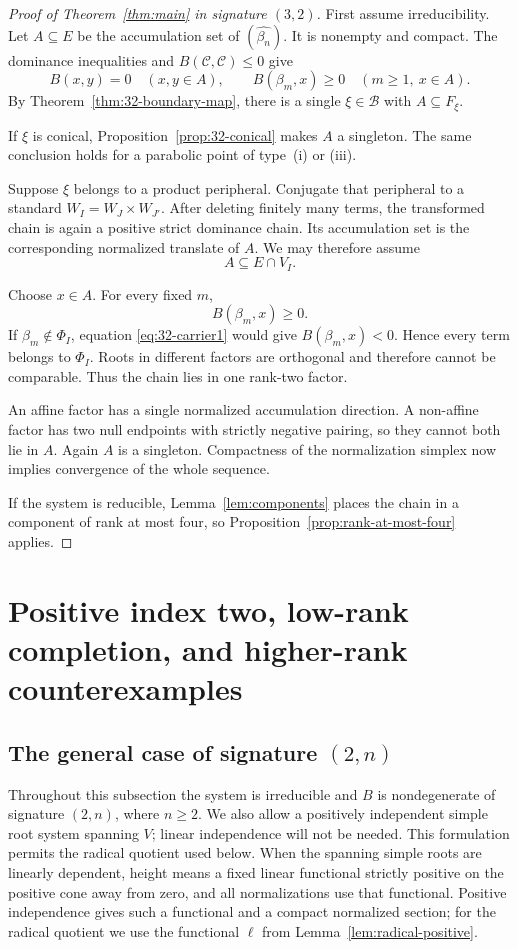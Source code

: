 \documentclass[11pt,reqno]{amsart}
\theoremstyle{plain}
\theoremstyle{definition}
\theoremstyle{remark}
\numberwithin{equation}{section}
\begin{document}
\begin{proof}[Proof of Theorem~\ref{thm:main} in signature $(3,2)$]
First assume irreducibility.
Let $A\subseteq E$ be the accumulation set of
$(\widehat{\beta_n})$.
It is nonempty and compact.
The dominance inequalities and
$B(\mathcal C,\mathcal C)\leq0$ give
\[
    B(x,y)=0\quad(x,y\in A),
    \qquad
    B(\beta_m,x)\geq0\quad(m\geq1,\ x\in A).
\]
By Theorem~\ref{thm:32-boundary-map},
there is a single $\xi\in\mathcal B$ with
$A\subseteq F_\xi$.

If $\xi$ is conical,
Proposition~\ref{prop:32-conical} makes $A$ a singleton.
The same conclusion holds for a parabolic point of
type~\textup{(i)} or \textup{(iii)}.

Suppose $\xi$ belongs to a product peripheral.
Conjugate that peripheral to a standard
$W_I=W_J\times W_{J'}$.
After deleting finitely many terms, the transformed
chain is again a positive strict dominance chain.
Its accumulation set is the corresponding normalized
translate of $A$.
We may therefore assume
\[
    A\subseteq E\cap V_I.
\]

Choose $x\in A$.
For every fixed $m$,
\[
    B(\beta_m,x)\geq0.
\]
If $\beta_m\notin\Phi_I$,
equation \eqref{eq:32-carrier1} would give
$B(\beta_m,x)<0$.
Hence every term belongs to $\Phi_I$.
Roots in different factors are orthogonal and therefore
cannot be comparable.
Thus the chain lies in one rank-two factor.

An affine factor has a single normalized accumulation
direction.
A non-affine factor has two null endpoints with strictly
negative pairing, so they cannot both lie in $A$.
Again $A$ is a singleton.
Compactness of the normalization simplex now implies
convergence of the whole sequence.

If the system is reducible, Lemma~\ref{lem:components} places the chain in a component of rank at most four, so Proposition~\ref{prop:rank-at-most-four} applies.
\end{proof}


\section{Positive index two, low-rank completion, and higher-rank counterexamples}\label{sec:higher-rank}
\subsection{The general case of signature \texorpdfstring{$(2,n)$}{(2,n)}}\label{subsec:2n-general}
Throughout this subsection the system is irreducible and $B$ is nondegenerate of signature $(2,n)$, where $n\geq2$. We also allow a positively independent simple root system spanning $V$; linear independence will not be needed. This formulation permits the radical quotient used below. When the spanning simple roots are linearly dependent, height means a fixed linear functional strictly positive on the positive cone away from zero, and all normalizations use that functional. Positive independence gives such a functional and a compact normalized section; for the radical quotient we use the functional $\ell$ from Lemma~\ref{lem:radical-positive}.
\end{document}
